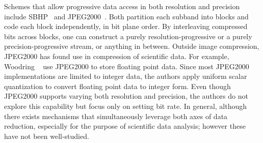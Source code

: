 Schemes that allow progressive data access in both resolution and precision include
SBHP~\cite{sbhp2000} and JPEG2000~\cite{jpeg2000}. Both partition each subband into blocks and code
each block independently, in bit plane order. By interleaving compressed bits across blocks, one can
construct a purely resolution-progressive or a purely precision-progressive stream, or anything in
between. Outside image compression, JPEG2000 has found use in compression of scientific data. For
example, Woodring \etal~\cite{woodring2011} use JPEG2000 to store floating point data. Since most
JPEG2000 implementations are limited to integer data, the authors apply uniform scalar quantization
to convert floating point data to integer form. Even though JPEG2000 supports varying both
resolution and precision, the authors do not explore this capability but focus only on setting bit
rate. In general, although there exists mechanisms that simultaneously leverage both axes of data
reduction, especially for the purpose of scientific data analysis; however these have not been
well-studied.

